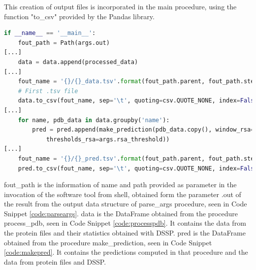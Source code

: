 This creation of output files is incorporated in the main procedure, using the function "to\_csv" provided by the Pandas library. 

\begin{lstlisting}[language=Python, caption=Creation of output files]
if __name__ == '__main__':
    fout_path = Path(args.out)
[...]
    data = data.append(processed_data)
[...]
    fout_name = '{}/{}_data.tsv'.format(fout_path.parent, fout_path.stem)
    # First .tsv file
    data.to_csv(fout_name, sep='\t', quoting=csv.QUOTE_NONE, index=False, float_format='%.3f')
[...]
    for name, pdb_data in data.groupby('name'):
        pred = pred.append(make_prediction(pdb_data.copy(), window_rsa=args.rsa_window,
            thresholds_rsa=args.rsa_threshold))
[...]
    fout_name = '{}/{}_pred.tsv'.format(fout_path.parent, fout_path.stem)
    pred.to_csv(fout_name, sep='\t', quoting=csv.QUOTE_NONE, index=False, float_format='%.3f')
\end{lstlisting}

fout\_path is the information of name and path provided as parameter in the invocation of the software tool from shell, obtained form the parameter .out of the result from the output data structure of parse\_args procedure, seen in Code Snippet \ref{code:parseargs}.
data is the DataFrame obtained from the procedure process\_pdb, seen in Code Snippet \ref{code:processpdb}. It contains the data from the protein files and their statistics obtained with DSSP.
pred is the DataFrame obtained from the procedure make\_prediction, seen in Code Snippet \ref{code:makepred}. It contains the predictions computed in that procedure and the data from protein files and DSSP.


